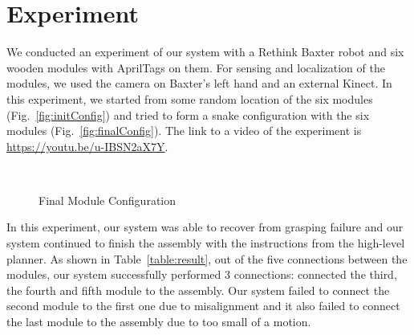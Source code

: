 \section{Experiment}

We conducted an experiment of our system with a Rethink Baxter robot and six wooden modules with AprilTags on them. For sensing and localization of the modules, we used the camera on Baxter's left hand and an external Kinect. In this experiment, we started from some random location of the six modules (Fig.~\ref{fig:initConfig}) and tried to form a snake configuration with the six modules (Fig.~\ref{fig:finalConfig}).
The link to a video of the experiment is \url{https://youtu.be/u-IBSN2aX7Y}. 

\begin{figure}[ht!]%
\centering
{}
\quad
{}\\
\caption{Final Module Configuration}
\end{figure}

In this experiment, our system was able to recover from grasping failure and our system continued to finish the assembly with the instructions from the high-level planner. As shown in Table~\ref{table:result}, out of the five connections between the modules, our system successfully performed 3 connections: connected the third, the fourth and fifth module to the assembly. Our system failed to connect the second module to the first one due to misalignment and it also failed to connect the last module to the assembly due to too small of a motion. 


